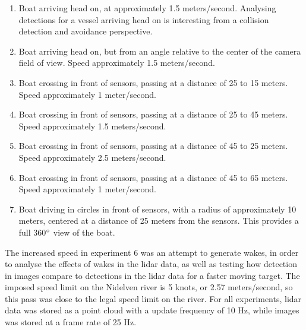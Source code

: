 \begin{enumerate}
	\item Boat arriving head on, at approximately 1.5 meters/second. Analysing detections for a vessel arriving head on is interesting from a collision detection and avoidance perspective.
	\item Boat arriving head on, but from an angle relative to the center of the camera field of view. Speed approximately 1.5 meters/second.
	\item Boat crossing in front of sensors, passing at a distance of 25 to 15 meters. Speed approximately 1 meter/second.
	\item Boat crossing in front of sensors, passing at a distance of 25 to 45 meters. Speed approximately 1.5 meters/second.
	\item Boat crossing in front of sensors, passing at a distance of 45 to 25 meters. Speed approximately 2.5 meters/second. 
	\item Boat crossing in front of sensors, passing at a distance of 45 to 65 meters. Speed approximately 1 meter/second.
	\item Boat driving in circles in front of sensors, with a radius of approximately 10 meters, centered at a distance of 25 meters from the sensors. This provides a full 360$\degree$ view of the boat.
\end{enumerate}
The increased speed in experiment 6 was an attempt to generate wakes, in order to analyse the effects of wakes in the lidar data, as well as testing how detection in images compare to detections in the lidar data for a faster moving target. The imposed speed limit on the Nidelven river is 5 knots, or 2.57 meters/second, so this pass was close to the legal speed limit on the river. For all experiments, lidar data was stored as a point cloud with a update frequency of 10 Hz, while images was stored at a frame rate of 25 Hz.
\cleardoublepage